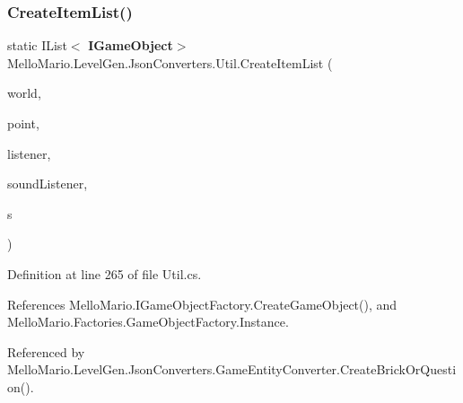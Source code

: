 \subsubsection{Create\+Item\+List()}
{\footnotesize\ttfamily static I\+List$<$\textbf{ I\+Game\+Object}$>$ Mello\+Mario.\+Level\+Gen.\+Json\+Converters.\+Util.\+Create\+Item\+List (\begin{DoxyParamCaption}\item[{\textbf{ I\+World}}]{world,  }\item[{Point}]{point,  }\item[{\textbf{ I\+Listener}$<$ \textbf{ I\+Game\+Object} $>$}]{listener,  }\item[{\textbf{ I\+Listener}$<$ \textbf{ I\+Soundable} $>$}]{sound\+Listener,  }\item[{params string [$\,$]}]{s }\end{DoxyParamCaption})\hspace{0.3cm}{\ttfamily [static]}}



Definition at line 265 of file Util.\+cs.



References Mello\+Mario.\+I\+Game\+Object\+Factory.\+Create\+Game\+Object(), and Mello\+Mario.\+Factories.\+Game\+Object\+Factory.\+Instance.



Referenced by Mello\+Mario.\+Level\+Gen.\+Json\+Converters.\+Game\+Entity\+Converter.\+Create\+Brick\+Or\+Question().


